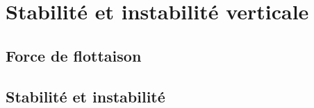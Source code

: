 

\mk
\section{Stabilité et instabilité verticale}

\sk
\subsection{Force de flottaison}



\sk
\subsection{Stabilité et instabilité}






